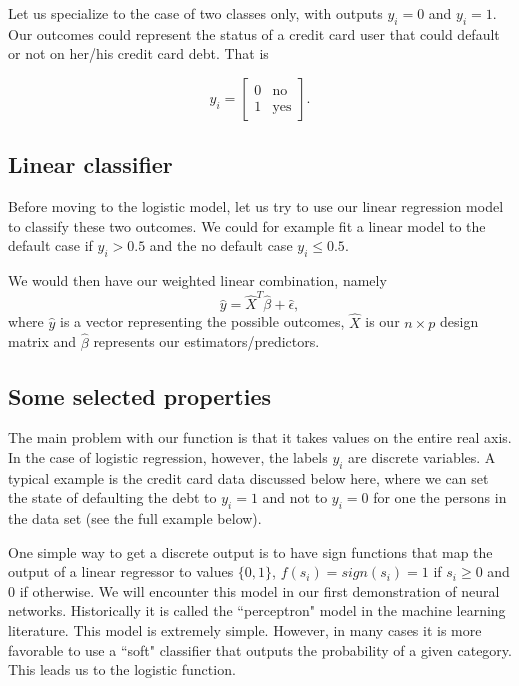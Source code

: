 \documentclass[%
oneside,                 %
final,                   %
10pt]{article}
\begin{document}
Let us specialize to the case of two classes only, with outputs
$y_i=0$ and $y_i=1$. Our outcomes could represent the status of a
credit card user that could default or not on her/his credit card
debt. That is


\[
y_i = \begin{bmatrix} 0 & \mathrm{no}\\  1 & \mathrm{yes} \end{bmatrix}.
\]



\subsection{Linear classifier}

Before moving to the logistic model, let us try to use our linear regression model to classify these two outcomes. We could for example fit a linear model to the default case if $y_i > 0.5$ and the no default case $y_i \leq 0.5$. 

We would then have our 
weighted linear combination, namely 
\begin{equation}
\hat{y} = \hat{X}^T\hat{\beta} +  \hat{\epsilon},
\end{equation}
where $\hat{y}$ is a vector representing the possible outcomes, $\hat{X}$ is our
$n\times p$ design matrix and $\hat{\beta}$ represents our estimators/predictors.

\subsection{Some selected properties}

The main problem with our  function is that it 
takes values on the entire real axis. In the case of
logistic regression, however, the labels $y_i$ are discrete
variables. A typical example is the credit card data discussed below here, where we can set the state of defaulting the debt to $y_i=1$ and not to $y_i=0$ for one the persons in the data set (see the full example below).

One simple way to get a discrete output is to have sign
functions that map the output of a linear regressor to values $\{0,1\}$,
$f(s_i)=sign(s_i)=1$ if $s_i\ge 0$ and 0 if otherwise. 
We will encounter this model in our first demonstration of neural networks. Historically it is called the ``perceptron" model in the machine learning
literature. This model is extremely simple. However, in many cases it is more
favorable to use a ``soft" classifier that outputs
the probability of a given category. This leads us to the logistic function.
\end{document}
